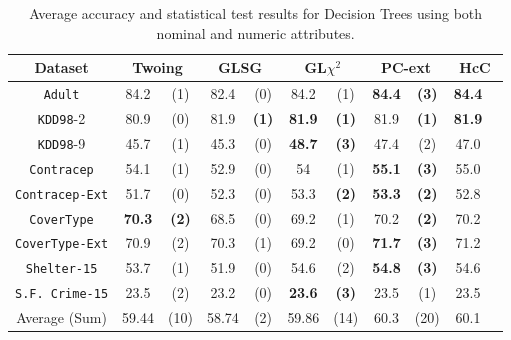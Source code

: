 \begin{table}
\small
\caption{Average accuracy and statistical test results for  Decision Trees using both nominal and numeric attributes.}
\centering
\begin{tabular}{c|cc|cc|cc|cc|cc} 
Dataset            &\multicolumn{2}{c|}{Twoing} & \multicolumn{2}{c|}{GLSG} & \multicolumn{2}{c|}{GL$\chi^2$} & \multicolumn{2}{c|}{PC-ext}& \multicolumn{2}{c}{HcC}\\  \hline   
{\tt Adult}        & 84.2           & (1)       & 82.4       & (0)          &  84.2       & (1)               & {\bf 84.4 } & {\bf (3) }  & {\bf 84.4 } &           \\
{\tt KDD98}-2      & 80.9           & (0)       & 81.9       & {\bf (1)}    & {\bf 81.9 } & {\bf (1) }        & 81.9        & {\bf (1) }  & {\bf 81.9 } &           \\ 
{\tt KDD98}-9      & 45.7           & (1)       & 45.3       &  (0)         & {\bf 48.7 } & {\bf (3) }        &  47.4       & (2)         & 47.0        &           \\ 
{\tt Contracep}    & 54.1           & (1)       & 52.9       &  (0)         & 54          & (1)               & {\bf 55.1 } & {\bf (3) }  & 55.0        &           \\  
{\tt Contracep-Ext}& 51.7           & (0)       & 52.3       &  (0)         & 53.3        & {\bf (2) }        & {\bf 53.3 } & {\bf (2) }  & 52.8        &           \\ 
{\tt CoverType}    &  {\bf 70.3 }   & {\bf (2)} & 68.5       &  (0)         & 69.2        & (1)               &  70.2       & {\bf (2) }  & 70.2        &           \\  
{\tt CoverType-Ext}& 70.9           & (2)       & 70.3       &  (1)         & 69.2        & (0)               & {\bf 71.7 } & {\bf (3) }  & 71.2        &           \\ 
{\tt Shelter-15}   & 53.7           & (1)       & 51.9       &  (0)         & 54.6        & (2)               & {\bf 54.8 } & {\bf (3) }  & 54.6        &           \\   
{\tt S.F. Crime-15}& 23.5           & (2)       & 23.2       &  (0)         & {\bf 23.6 } & {\bf (3) }        & 23.5        & (1)         & 23.5        &           \\ 
\hline
Average (Sum)      & 59.44          & (10)      & 58.74      &  (2)         & 59.86       & (14)              & 60.3        & (20)        & 60.1        & 

\end{tabular}
\label{exp:numeric-5}
\normalsize
\end{table}



